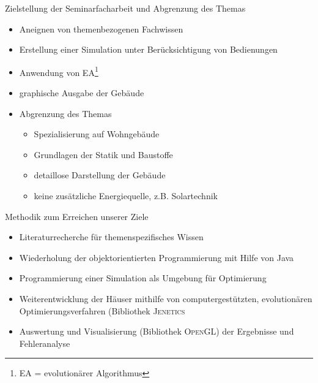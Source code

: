\documentclass[11pt]{beamer}
\begin{document}
\begin{frame}{Zielstellung der Seminarfacharbeit und Abgrenzung des Themas}
\begin{itemize}
\item{Aneignen von themenbezogenen Fachwissen}\pause
\item{Erstellung einer Simulation unter Berücksichtigung von Bedienungen}\pause
\item{Anwendung von EA\footnote{EA = evolutionärer Algorithmus}}\pause
\item{graphische Ausgabe der Gebäude}\pause
\item{Abgrenzung des Themas}\pause
\begin{itemize}
\item{Spezialisierung auf Wohngebäude}
\item{Grundlagen der Statik und Baustoffe}
\item{detaillose Darstellung der Gebäude}
\item{keine zusätzliche Energiequelle, z.B. Solartechnik} 
\end{itemize}
\end{itemize}
\end{frame}

\begin{frame}{Methodik zum Erreichen unserer Ziele}
\begin{itemize}
\item{Literaturrecherche für themenspezifisches Wissen}\pause
\item{Wiederholung der objektorientierten Programmierung mit Hilfe von Java}\pause
\item{Programmierung einer Simulation als Umgebung für Optimierung}\pause
\item{Weiterentwicklung der Häuser mithilfe von computergestützten, evolutionären Optimierungsverfahren (Bibliothek \textsc{Jenetics}}\pause
\item{Auswertung und Visualisierung (Bibliothek \textsc{OpenGL}) der Ergebnisse und Fehleranalyse}\pause
\end{itemize}
\end{frame}
\end{document}
